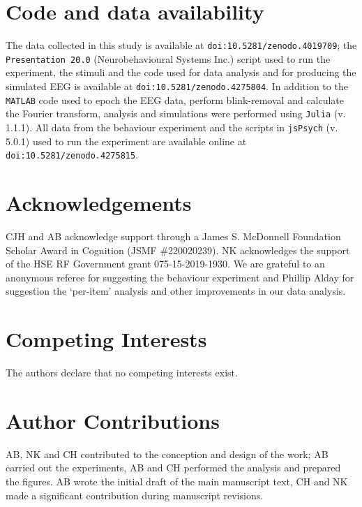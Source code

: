 \documentclass[11pt,a4wide]{article}
\begin{document}
\section*{Code and data availability}
The data collected in this study is available at
\texttt{doi:10.5281/zenodo.4019709}; the \texttt{Presentation 20.0}
(Neurobehavioural Systems Inc.) script used to run the experiment, the
stimuli and the code used for data analysis and for producing the
simulated EEG is available at \texttt{doi:10.5281/zenodo.4275804}. In
addition to the \texttt{MATLAB} code used to epoch the EEG data,
perform blink-removal and calculate the Fourier transform, analysis
and simulations were performed using \texttt{Julia} (v. 1.1.1). All data
from the behaviour experiment and the scripts in \texttt{jsPsych}
 (v. 5.0.1) used to run the experiment are available online at
\texttt{doi:10.5281/zenodo.4275815}.


\section*{Acknowledgements}
CJH and AB acknowledge support through a James S. McDonnell Foundation
Scholar Award in Cognition (JSMF \#220020239). NK acknowledges the
support of the HSE RF Government grant 075-15-2019-1930. We are
grateful to an anonymous referee for suggesting the behaviour
experiment and Phillip Alday for suggestion the `per-item' analysis
and other improvements in our data analysis.


\section*{Competing Interests}
The authors declare that no competing interests exist.

{}

\section*{Author Contributions}
AB, NK and CH contributed to the conception and design of the work;
AB carried out the experiments, AB and CH performed the analysis and
prepared the figures. AB wrote the initial draft of the main
manuscript text, CH and NK made a significant contribution during
manuscript revisions.
\end{document}
